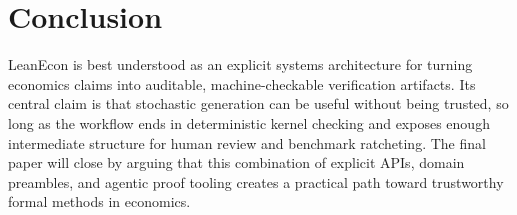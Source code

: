 \documentclass[11pt,letterpaper]{article}
\begin{document}
\section{Conclusion}

LeanEcon is best understood as an explicit systems architecture for turning economics claims into auditable, machine-checkable verification artifacts. Its central claim is that stochastic generation can be useful without being trusted, so long as the workflow ends in deterministic kernel checking and exposes enough intermediate structure for human review and benchmark ratcheting. The final paper will close by arguing that this combination of explicit APIs, domain preambles, and agentic proof tooling creates a practical path toward trustworthy formal methods in economics.



\end{document}
